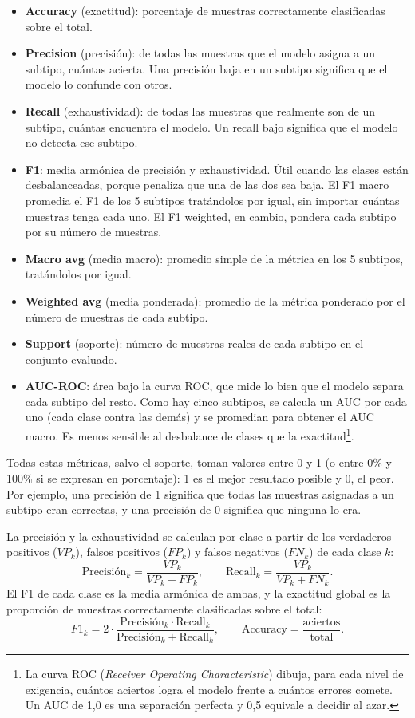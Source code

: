 \documentclass[12pt, a4paper]{report}
\begin{document}
\begin{itemize}
  \item \textbf{Accuracy} (exactitud): porcentaje de muestras correctamente clasificadas sobre el total.
  \item \textbf{Precision} (precisión): de todas las muestras que el modelo asigna a un subtipo, cuántas acierta. Una precisión baja en un subtipo significa que el modelo lo confunde con otros.
  \item \textbf{Recall} (exhaustividad): de todas las muestras que realmente son de un subtipo, cuántas encuentra el modelo. Un recall bajo significa que el modelo no detecta ese subtipo.
  \item \textbf{F1}: media armónica de precisión y exhaustividad. Útil cuando las clases están desbalanceadas, porque penaliza que una de las dos sea baja. El F1 macro promedia el F1 de los 5 subtipos tratándolos por igual, sin importar cuántas muestras tenga cada uno. El F1 weighted, en cambio, pondera cada subtipo por su número de muestras.
  \item \textbf{Macro avg} (media macro): promedio simple de la métrica en los 5 subtipos, tratándolos por igual.
  \item \textbf{Weighted avg} (media ponderada): promedio de la métrica ponderado por el número de muestras de cada subtipo.
  \item \textbf{Support} (soporte): número de muestras reales de cada subtipo en el conjunto evaluado.
  \item \textbf{AUC-ROC}: área bajo la curva ROC, que mide lo bien que el modelo separa cada subtipo del resto. Como hay cinco subtipos, se calcula un AUC por cada uno (cada clase contra las demás) y se promedian para obtener el AUC macro. Es menos sensible al desbalance de clases que la exactitud\footnote{La curva ROC (\textit{Receiver Operating Characteristic}) dibuja, para cada nivel de exigencia, cuántos aciertos logra el modelo frente a cuántos errores comete. Un AUC de 1,0 es una separación perfecta y 0,5 equivale a decidir al azar.}.
\end{itemize}

Todas estas métricas, salvo el soporte, toman valores entre 0 y 1 (o entre 0\% y 100\% si se expresan en porcentaje): 1 es el mejor resultado posible y 0, el peor. Por ejemplo, una precisión de 1 significa que todas las muestras asignadas a un subtipo eran correctas, y una precisión de 0 significa que ninguna lo era.

La precisión y la exhaustividad se calculan por clase a partir de los verdaderos positivos ($VP_k$), falsos positivos ($FP_k$) y falsos negativos ($FN_k$) de cada clase $k$:
\[
\text{Precisión}_k = \frac{VP_k}{VP_k + FP_k}, \qquad \text{Recall}_k = \frac{VP_k}{VP_k + FN_k}.
\]
El F1 de cada clase es la media armónica de ambas, y la exactitud global es la proporción de muestras correctamente clasificadas sobre el total:
\[
F1_k = 2 \cdot \frac{\text{Precisión}_k \cdot \text{Recall}_k}{\text{Precisión}_k + \text{Recall}_k}, \qquad
\text{Accuracy} = \frac{\text{aciertos}}{\text{total}}.
\]
\end{document}
